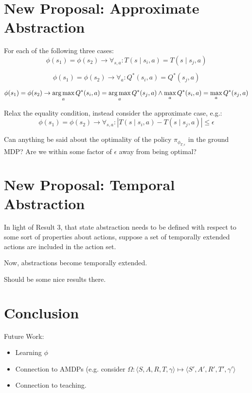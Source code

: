 \documentclass[11pt]{amsart}
\begin{document}
\midline

\newpage
\section{New Proposal: Approximate Abstraction}


For each of the following three cases:
\begin{equation}
 \phi(s_1) = \phi(s_2) \rightarrow \forall_{s,a} : T(s \mid s_i, a) = T(s \mid s_j, a)
\end{equation}

\begin{equation}
 \phi(s_1) = \phi(s_2) \rightarrow \forall_a : Q^*(s_i, a) = Q^*(s_j, a)
\end{equation}

\begin{equation}
 \phi(s_1) = \phi(s_2) \rightarrow \operatorname*{arg\,max}_a Q^*(s_i, a) = \operatorname*{arg\,max}_a Q^*(s_j, a) \wedge \max_a Q^*(s_i, a) = \max_a Q^*(s_j, a)
\end{equation}

Relax the equality condition, instead consider the approximate case, e.g.:
\begin{equation}
 \phi(s_1) = \phi(s_2) \rightarrow \forall_{s,a} : |T(s \mid s_i, a) - T(s \mid s_j, a)| \leq \epsilon
\end{equation}

 Can anything be said about the optimality of the policy $\pi_{\phi_{T,\epsilon}}$ in the ground MDP? Are we within some factor of $\epsilon$ away from being optimal?


\newpage
\section{New Proposal: Temporal Abstraction}

In light of Result 3, that state abstraction needs to be defined with respect to some sort of properties about actions, suppose a set of temporally extended actions are included in the action set.

Now, abstractions become temporally extended.

Should be some nice results there.




\newpage
\section{Conclusion}

Future Work:
\begin{itemize}
\item Learning $\phi$
\item Connection to AMDPs (e.g. consider $\Omega : \langle S, A, R, T, \gamma \rangle \mapsto \langle S', A', R', T', \gamma' \rangle$
\item Connection to teaching.
\end{itemize}



\newpage

\end{document}
